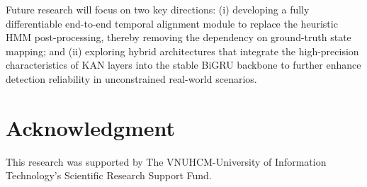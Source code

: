 \documentclass[conference]{IEEEtran}
\begin{document}
Future research will focus on two key directions: (i) developing a fully differentiable end-to-end temporal alignment module to replace the heuristic HMM post-processing, thereby removing the dependency on ground-truth state mapping; and (ii) exploring hybrid architectures that integrate the high-precision characteristics of KAN layers into the stable BiGRU backbone to further enhance detection reliability in unconstrained real-world scenarios.


\section*{Acknowledgment}

This research was supported by The VNUHCM-University of Information Technology’s Scientific Research Support Fund.
\end{document}
